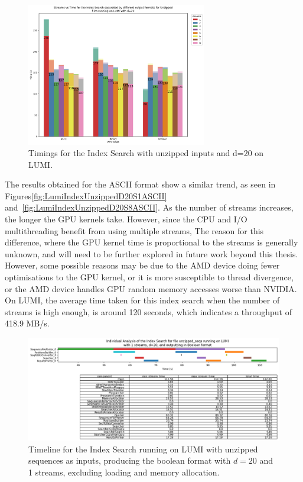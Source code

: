 \begin{figure}[t]
  \centering
  \includegraphics[width=0.7\textwidth]{images/LumiIndexUnzippedD20.png}
  \caption{Timings for the Index Search with unzipped inputs and d=20 on LUMI.}\label{fig:LumiIndexUnzippedD20}
\end{figure}


The results obtained for the ASCII format show a similar trend, as seen in Figures\ref{fig:LumiIndexUnzippedD20S1ASCII}  and~\ref{fig:LumiIndexUnzippedD20S8ASCII}.
As the number of streams increases, the longer the GPU kernels take.
However, since the CPU and I/O multithreading benefit from using multiple streams,
The reason for this difference, where the GPU kernel time is proportional to the streams is generally unknown, and will need to be further explored in future work beyond this thesis.
However, some possible reasons may be due to the AMD device doing fewer optimisations to the GPU kernel, or it is more susceptible to thread divergence, or the AMD device handles GPU random memory accesses worse than NVIDIA.
On LUMI, the average time taken for this index search when the number of streams is high enough, is around 120 seconds, which indicates a throughput of 418.9 MB/s.

\begin{figure}[t]
  \centering
  \includegraphics[width=\textwidth]{images/LumiIndexUnzippedD20S1Boolean.png}
  \caption{Timeline for the Index Search running on LUMI with unzipped sequences as inputs, producing the boolean format with $d=20$ and 1 streams, excluding loading and memory allocation.}\label{fig:LumiIndexUnzippedD20S1Boolean}
\end{figure}

